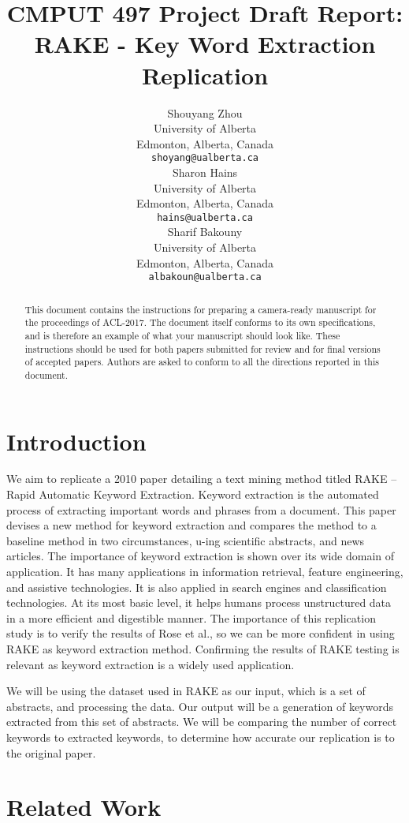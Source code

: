 \documentclass[11pt,a4paper]{article}
\title{CMPUT 497 Project Draft Report: \\ RAKE - Key Word Extraction Replication}
\author{Shouyang Zhou \\
  University of Alberta \\
  Edmonton, Alberta, Canada \\
  {\tt shoyang@ualberta.ca} \\\And
  Sharon Hains \\
  University of Alberta \\
  Edmonton, Alberta, Canada \\
  {\tt hains@ualberta.ca} \\\And
  Sharif Bakouny \\
  University of Alberta \\
  Edmonton, Alberta, Canada \\
  {\tt albakoun@ualberta.ca} \\}
\date{}
\begin{document}
\maketitle
\begin{abstract}
  This document contains the instructions for preparing a camera-ready
  manuscript for the proceedings of ACL-2017. The document itself
  conforms to its own specifications, and is therefore an example of
  what your manuscript should look like. These instructions should be
  used for both papers submitted for review and for final versions of
  accepted papers.  Authors are asked to conform to all the directions
  reported in this document.
\end{abstract}

\section{Introduction}

We aim to replicate a 2010 paper detailing a text mining method titled RAKE – Rapid Automatic Keyword Extraction. Keyword extraction is the automated process of extracting important words and phrases from a document. This paper devises a new method for keyword extraction and compares the method to a baseline method in two circumstances, u-ing scientific abstracts, and news articles. The importance of keyword extraction is shown over its wide domain of application. It has many applications in information retrieval, feature engineering, and assistive technologies.  It is also applied in search engines and classification technologies. At its most basic level, it helps humans process unstructured data in a more efficient and digestible manner. The importance of this replication study is to verify the results of Rose et al., so we can be more confident in using RAKE as keyword extraction method. Confirming the results of RAKE testing is relevant as keyword extraction is a widely used application. 

We will be using the dataset used in RAKE as our input, which is a set of abstracts, and processing the data. Our output will be a generation of keywords extracted from this set of abstracts. We will be comparing the number of correct keywords to extracted keywords, to determine how accurate our replication is to the original paper. 

\section{Related Work}
\end{document}
